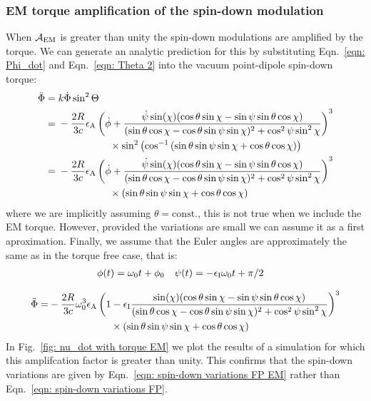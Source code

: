 \documentclass[../full_thesis/full_thesis.tex]{subfiles}
\begin{document}
\subsubsection{EM torque amplification of the spin-down modulation}
When $\mathcal{A}_{\mathrm{EM}}$ is greater than unity the spin-down modulations are amplified by
the torque. We can generate an analytic prediction for this by substituting
Eqn.~\eqref{eqn: Phi_dot} and Eqn.~\eqref{eqn: Theta 2} into the vacuum point-dipole spin-down
torque:
\begin{align*}
\ddot{\Phi} = {} & k \dot{\Phi}\sin^{2}\Theta \\
            = {} & -\frac{2R}{3c} \epsA
                   \left(\dot{\phi}
                         +\frac{\dot{\psi}\sin(\chi)
                                (\cos\theta\sin\chi - \sin \psi \sin \theta \cos\chi)
                               }{
                                (\sin\theta \cos \chi - \cos \theta \sin \psi \sin \chi)^{2}
                         + \cos^{2}\psi \sin^{2} \chi}\right)^{3} \\
            &  \hspace{18mm}  \times  \sin^{2}\left(\cos^{-1}\left(
                     \sin\theta\sin\psi\sin\chi + \cos\theta\cos\chi\right)\right)\\
    = {} & -\frac{2R}{3c} \epsA
    \left(\dot{\phi}+\frac{\dot{\psi} \sin(\chi)(\cos\theta\sin\chi
          -\sin \psi \sin \theta \cos\chi)}
         {(\sin\theta \cos \chi - \cos \theta \sin \psi \sin \chi)^{2}
         + \cos^{2}\psi \sin^{2} \chi}\right)^{3} \\
   & \hspace{18mm} \times \left(\sin\theta\sin\psi\sin\chi + \cos\theta\cos\chi\right)
\end{align*}
where we are implicitly assuming $\theta=\mathrm{const.}$, this is not true
when we include the EM torque. However, provided the variations are small we
can assume it as a first aproximation.  Finally, we assume that the Euler angles
are approximately the same as in the torque free case, that is:
\begin{align}
    \phi(t) = \omega_{0}t + \phi_{0} &&& \psi(t) = -\epsilon_{\mathrm{I}} \omega_{0} t + \pi/2
\end{align}

 \begin{align}
\begin{split}
     \ddot{\Phi} =&-\frac{2R}{3c} \omega_{0}^{3}\epsA
     \left(1 -  \epsI\frac{ \sin(\chi)(\cos\theta\sin\chi - \sin \psi \sin \theta \cos\chi)
     }{(\sin\theta \cos \chi - \cos \theta \sin \psi \sin \chi)^{2} + \cos^{2}\psi \sin^{2} \chi}\right)^{3}\\
     &\hspace{22mm}\times\left(\sin\theta\sin\psi\sin\chi + \cos\theta\cos\chi\right)
     \label{eqn: Phi_dot EM}
\end{split}
\end{align}
In Fig.~\ref{fig: nu_dot with torque EM} we plot the results of a simulation
for which this amplifcation factor is greater than unity. This confirms that the
spin-down variations are given by Eqn.~\ref{eqn: spin-down variations FP EM} rather
than Eqn.~\eqref{eqn: spin-down variations FP}.
\end{document}
